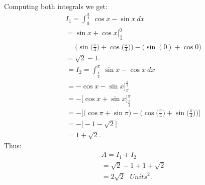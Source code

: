 \documentclass{report}
\begin{document}
    \bigbreak \noindent 
    Computing both integrals we get:
    \begin{align*}
        &I_{1} = \int_{0}^{\frac{\pi}{4}}\ \cos{x}-\sin{x}\ dx \\
        &=\sin{x} + \cos{x}\bigg]^{0}_{\frac{\pi}{4}} \\
        &= \bigg(\sin{\bigg(\frac{\pi}{4}\bigg)+\cos{\bigg(\frac{\pi}{4}\bigg)}}\bigg) - \bigg(\sin{(0)+\cos{0}}\bigg)\\
        &= \sqrt{2} - 1
    .\end{align*}
    \begin{align*}
        &=I_{2} = \int_{\frac{\pi}{4}}^{\pi}\ \sin{x}-\cos{x}\ dx \\
        &= -\cos{x}-\sin{x}\bigg]^{\frac{\pi}{4}}_{\pi} \\
        &= - \bigg[\cos{x}+\sin{x}\bigg]^{\pi}_{\frac{\pi}{4}} \\
        &= - \bigg[\bigg(\cos{\pi}+\sin{\pi}\bigg) - \bigg(\cos{\bigg(\frac{\pi}{4}\bigg)+\sin{\bigg(\frac{\pi}{4}\bigg)}}\bigg)\bigg] \\
        &= - \bigg[-1 - \sqrt{2}\bigg] \\
        &= 1 + \sqrt{2}
    .\end{align*}
    \bigbreak \noindent 
    Thus:
    \begin{align*}
        &A = I_{1} + I_{2} \\
        &= \sqrt{2} - 1 + 1 + \sqrt{2} \\
        & = 2\sqrt{2}\ \ \ Units^{2}
    .\end{align*}

    \pagebreak 
\end{document}
